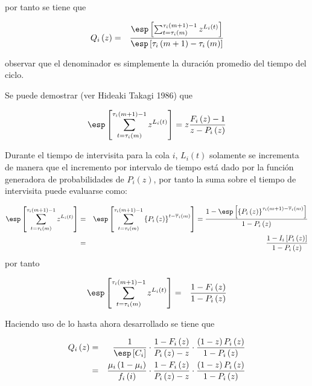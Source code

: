 por tanto se tiene que


\begin{eqnarray*}
Q_{i}\left(z\right)&=&\frac{\esp\left[\sum_{t=\tau_{i}\left(m\right)}^{\tau_{i}\left(m+1\right)-1}z^{L_{i}\left(t\right)}\right]}{\esp\left[\tau_{i}\left(m+1\right)-\tau_{i}\left(m\right)\right]}
\end{eqnarray*}

observar que el denominador es simplemente la duraci\'on promedio del tiempo del ciclo.


Se puede demostrar (ver Hideaki Takagi 1986) que

\begin{eqnarray*}
\esp\left[\sum_{t=\tau_{i}\left(m\right)}^{\tau_{i}\left(m+1\right)-1}z^{L_{i}\left(t\right)}\right]=z\frac{F_{i}\left(z\right)-1}{z-P_{i}\left(z\right)}
\end{eqnarray*}

Durante el tiempo de intervisita para la cola $i$, $L_{i}\left(t\right)$ solamente se incrementa de manera que el incremento por intervalo de tiempo est\'a dado por la funci\'on generadora de probabilidades de $P_{i}\left(z\right)$, por tanto la suma sobre el tiempo de intervisita puede evaluarse como:

\begin{eqnarray*}
\esp\left[\sum_{t=\tau_{i}\left(m\right)}^{\tau_{i}\left(m+1\right)-1}z^{L_{i}\left(t\right)}\right]&=&\esp\left[\sum_{t=\tau_{i}\left(m\right)}^{\tau_{i}\left(m+1\right)-1}\left\{P_{i}\left(z\right)\right\}^{t-\overline{\tau}_{i}\left(m\right)}\right]=\frac{1-\esp\left[\left\{P_{i}\left(z\right)\right\}^{\tau_{i}\left(m+1\right)-\overline{\tau}_{i}\left(m\right)}\right]}{1-P_{i}\left(z\right)}\\
&=&\frac{1-I_{i}\left[P_{i}\left(z\right)\right]}{1-P_{i}\left(z\right)}
\end{eqnarray*}
por tanto

\begin{eqnarray*}
\esp\left[\sum_{t=\tau_{i}\left(m\right)}^{\tau_{i}\left(m+1\right)-1}z^{L_{i}\left(t\right)}\right]&=&\frac{1-F_{i}\left(z\right)}{1-P_{i}\left(z\right)}
\end{eqnarray*}

Haciendo uso de lo hasta ahora desarrollado se tiene que

\begin{eqnarray*}
Q_{i}\left(z\right)&=&\frac{1}{\esp\left[C_{i}\right]}\cdot\frac{1-F_{i}\left(z\right)}{P_{i}\left(z\right)-z}\cdot\frac{\left(1-z\right)P_{i}\left(z\right)}{1-P_{i}\left(z\right)}\\
&=&\frac{\mu_{i}\left(1-\mu_{i}\right)}{f_{i}\left(i\right)}\cdot\frac{1-F_{i}\left(z\right)}{P_{i}\left(z\right)-z}\cdot\frac{\left(1-z\right)P_{i}\left(z\right)}{1-P_{i}\left(z\right)}
\end{eqnarray*}

